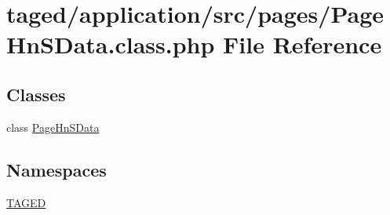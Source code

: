 \hypertarget{_page_hn_s_data_8class_8php}{}\section{taged/application/src/pages/\+Page\+Hn\+S\+Data.class.\+php File Reference}
\label{_page_hn_s_data_8class_8php}
\subsection*{Classes}
\begin{DoxyCompactItemize}
\item 
class \hyperlink{class_page_hn_s_data}{Page\+Hn\+S\+Data}
\end{DoxyCompactItemize}
\subsection*{Namespaces}
\begin{DoxyCompactItemize}
\item 
 \hyperlink{namespace_t_a_g_e_d}{T\+A\+G\+ED}
\end{DoxyCompactItemize}
